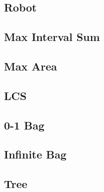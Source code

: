     \subsection{Robot}
        
    \subsection{Max Interval Sum}
        
    \subsection{Max Area}
        
    \subsection{LCS}
        
    \subsection{0-1 Bag}
        
    \subsection{Infinite Bag}
        
    \subsection{Tree}
        